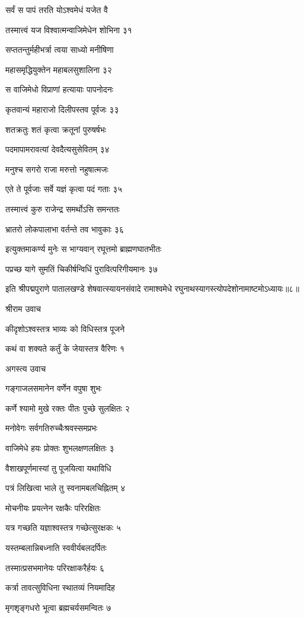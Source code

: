 सर्वं स पापं तरति योऽश्वमेधं यजेत वै

तस्मात्त्वं यज विश्वात्मन्वाजिमेधेन शोभिना ३१

सप्ततन्तुर्महीभर्त्रा त्वया साध्यो मनीषिणा

महासमृद्धियुक्तेन महाबलसुशालिना ३२

स वाजिमेधो विप्राणां हत्यायाः पापनोदनः

कृतवान्यं महाराजो दिलीपस्तव पूर्वजः ३३

शतक्रतुः शतं कृत्वा क्रतूनां पुरुषर्षभः

पदमापामरावत्यां देवदैत्यसुसेवितम् ३४

मनुश्च सगरो राजा मरुत्तो नहुषात्मजः

एते ते पूर्वजाः सर्वे यज्ञं कृत्वा पदं गताः ३५

तस्मात्त्वं कुरु राजेन्द्र समर्थोऽसि समन्ततः

भ्रातरो लोकपालाभा वर्तन्ते तव भावुकाः ३६

इत्युक्तमाकर्ण्य मुनेः स भाग्यवान् रघूत्तमो ब्राह्मणघातभीतः

पप्रच्छ यागे सुमतिं चिकीर्षन्विधिं पुरावित्परिगीयमानः ३७

इति श्रीपद्मपुराणे पातालखण्डे शेषवात्स्यायनसंवादे रामाश्वमेधे रघुनाथस्यागस्त्योपदेशोनामाष्टमोऽध्यायः॥८॥


श्रीराम उवाच

कीदृशोऽश्वस्तत्र भाव्यः को विधिस्तत्र पूजने

कथं वा शक्यते कर्तुं के जेयास्तत्र वैरिणः १

अगस्त्य उवाच

गङ्गाजलसमानेन वर्णेन वपुषा शुभः

कर्णे श्यामो मुखे रक्तः पीतः पुच्छे सुलक्षितः २

मनोवेगः सर्वगतिरुच्चैःश्रवस्समप्रभः

वाजिमेधे हयः प्रोक्तः शुभलक्षणलक्षितः ३

वैशाखपूर्णमास्यां तु पूजयित्वा यथाविधि

पत्रं लिखित्वा भाले तु स्वनामबलचिह्नितम् ४

मोचनीयः प्रयत्नेन रक्षकैः परिरक्षितः

यत्र गच्छति यज्ञाश्वस्तत्र गच्छेत्सुरक्षकः ५

यस्तम्बलान्निबध्नाति स्ववीर्यबलदर्पितः

तस्मात्प्रसभमानेयः परिरक्षाकरैर्हयः ६

कर्त्रा तावत्सुविधिना स्थातव्यं नियमादिह

मृगशृङ्गधरो भूत्वा ब्रह्मचर्यसमन्वितः ७

